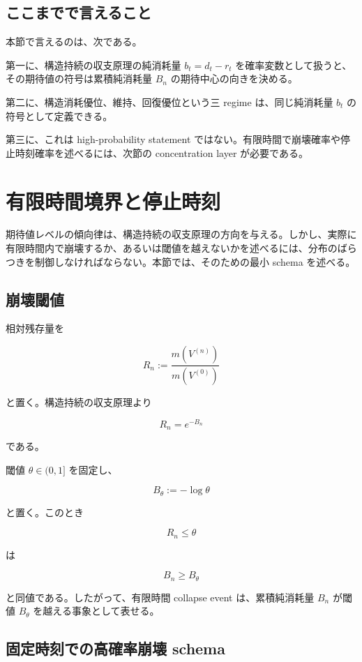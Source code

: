\documentclass[12pt,a4paper]{article}
\begin{document}
\subsection{ここまでで言えること}\label{ux3053ux3053ux307eux3067ux3067ux8a00ux3048ux308bux3053ux3068}

本節で言えるのは、次である。

第一に、構造持続の収支原理の純消耗量 \(b_{t}=d_{t}-r_{t}\) を確率変数として扱うと、その期待値の符号は累積純消耗量 \(B_{n}\) の期待中心の向きを決める。

第二に、構造消耗優位、維持、回復優位という三 regime は、同じ純消耗量 \(b_{t}\) の符号として定義できる。

第三に、これは high-probability statement ではない。有限時間で崩壊確率や停止時刻確率を述べるには、次節の concentration layer が必要である。

\section{有限時間境界と停止時刻}\label{ux6709ux9650ux6642ux9593ux5883ux754cux3068ux505cux6b62ux6642ux523b}

期待値レベルの傾向律は、構造持続の収支原理の方向を与える。しかし、実際に有限時間内で崩壊するか、あるいは閾値を越えないかを述べるには、分布のばらつきを制御しなければならない。本節では、そのための最小 schema を述べる。

\subsection{崩壊閾値}\label{ux5d29ux58caux95beux5024}

相対残存量を

\[
R_{n} := \frac{m(V^{(n)})}{m(V^{(0)})}
\]

と置く。構造持続の収支原理より

\[
R_{n} = e^{-B_{n}}
\]

である。

閾値 \(\theta\in(0,1]\) を固定し、

\[
B_\theta := -\log \theta
\]

と置く。このとき

\[
R_{n} \le \theta
\]

は

\[
B_{n} \ge B_\theta
\]

と同値である。したがって、有限時間 collapse event は、累積純消耗量 \(B_{n}\) が閾値 \(B_\theta\) を越える事象として表せる。

\subsection{固定時刻での高確率崩壊 schema}\label{ux56faux5b9aux6642ux523bux3067ux306eux9ad8ux78baux7387ux5d29ux58ca-schema}
\end{document}
